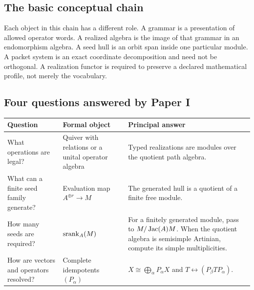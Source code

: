 \subsection*{The basic conceptual chain}

Each object in this chain has a different role.  A grammar is a presentation of allowed operator words.  A realized algebra is the image of that grammar in an endomorphism algebra.  A seed hull is an orbit span inside one particular module.  A packet system is an exact coordinate decomposition and need not be orthogonal.  A realization functor is required to preserve a declared mathematical profile, not merely the vocabulary.

\subsection*{Four questions answered by Paper I}
\begin{center}
\begin{tabularx}{0.96\textwidth}{@{}>{\raggedright\arraybackslash}p{}Y Y@{}}
\toprule
\textbf{Question} & \textbf{Formal object} & \textbf{Principal answer}\\
\midrule
What operations are legal? & Quiver with relations or a unital operator algebra & Typed realizations are modules over the quotient path algebra.\\
What can a finite seed family generate? & Evaluation map \(A^{\oplus r}\to M\) & The generated hull is a quotient of a finite free module.\\
How many seeds are required? & \(\operatorname{srank}_A(M)\) & For a finitely generated module, pass to \(M/\operatorname{Jac}(A)M\). When the quotient algebra is semisimple Artinian, compute its simple multiplicities.\\
How are vectors and operators resolved? & Complete idempotents \((P_\alpha)\) & \(X\cong\bigoplus_\alpha P_\alpha X\) and \(T\leftrightarrow(P_\beta TP_\alpha)\).\\
\bottomrule
\end{tabularx}
\end{center}

